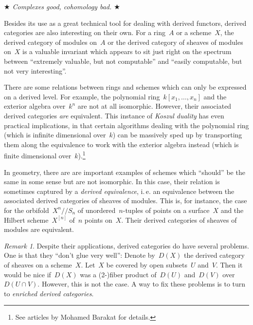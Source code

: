 \documentclass{amsart}
\makeatletter
\theoremstyle{definition}
\theoremstyle{plain}
\theoremstyle{remark}
\newtheorem{rem}[defn]{Remark}
\newcommand{\?}{\,{:}\,}
\renewcommand{\_}{\mathpunct{.}\,}
\newcommand{\ie}{i.\,e.\@\xspace}
\makeatother
\begin{document}
\begin{center}\emph{$\bigstar$ Complexes good, cohomology bad. $\bigstar$}\end{center}

Besides its use as a great technical tool for dealing with derived functors,
derived categories are also interesting on their own. For a ring~$A$ or a
scheme~$X$, the derived category of modules on~$A$ or the derived category of
sheaves of modules on~$X$ is a valuable invariant which appears to sit just
right on the spectrum between ``extremely valuable, but not computable'' and
``easily computable, but not very interesting''.

There are some relations between rings and schemes which can only be expressed
on a derived level. For example, the polynomial ring~$k[x_1,\ldots,x_n]$ and
the exterior algebra over~$k^n$ are not at all isomorphic. However, their
associated derived categories \emph{are} equivalent. This instance of \emph{Koszul
duality} has even practical implications, in that certain algorithms dealing
with the polynomial ring (which is infinite dimensional over~$k$) can be
massively sped up by transporting them along the equivalence to work with the
exterior algebra instead (which is finite dimensional over~$k$).\footnote{See
articles by Mohamed Barakat for details.}

In geometry, there are are important examples of schemes which ``should'' be
the same in some sense but are not isomorphic. In this case, their relation is
sometimes captured by a \emph{derived equivalence}, \ie an equivalence between
the associated derived categories of sheaves of modules. This is, for instance,
the case for the orbifold~$X^n/\!\!/S_n$ of unordered~$n$-tuples of points on a
surface~$X$ and the Hilbert scheme~$X^{[n]}$ of~$n$ points on~$X$. Their
derived categories of sheaves of modules are equivalent.

\begin{rem}Despite their applications, derived categories do have several
problems. One is that they ``don't glue very well'': Denote by~$D(X)$ the
derived category of sheaves on a scheme~$X$. Let~$X$ be covered by open
subsets~$U$ and~$V$. Then it would be nice if~$D(X)$ was a (2-)fiber product
of~$D(U)$ and~$D(V)$ over~$D(U \cap V)$. However, this is not the case. A way
to fix these problems is to turn to \emph{enriched derived categories}.
\end{rem}
\end{document}
